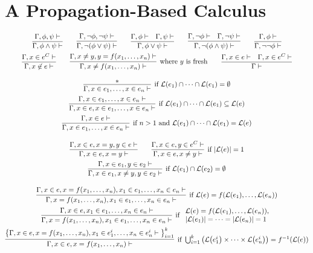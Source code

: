 
\section{A Propagation-Based Calculus}
\label{sect:calculus}

\begin{table}
  \begin{gather*}
    \infer
    {\seqq{\phi \wedge \psi}}
    {\seqq{\phi, \psi}}
    \qquad
    \infer
    {\seqq{ \neg(\phi \vee \psi)}}
    {\seqq{ \neg\phi, \neg\psi}}
    \qquad
    \infer
    {\seqq{\phi \vee \psi}}
    {\seqq{\phi} & \seqq{\psi}}
    \qquad
    \infer
    {\seqq{\neg(\phi \wedge \psi)}}
    {\seqq{\neg\phi} & \seqq{\neg\psi}}
    \qquad
    \infer
    {\seqq{ \neg\neg\phi}}
    {\seqq{\phi}}
    \\
    \infer
    {\seqq{x \not\in e}}
    {\seqq{x \in e^C}}
    \qquad
    \infer[\text{where~} y \text{~is fresh}]
    {\seqq{x \not= f(x_1, \ldots, x_n)}}
    {\seqq{x \not= y, y = f(x_1, \ldots, x_n)}}
    \qquad
    \infer
    {\seqq{}}
    {\seqq{x \in e} & \seqq{x \in e^C}}
    \\[2ex]
    \infer[\text{if~} \lang{e_1} \cap \cdots \cap\lang{e_1} = \emptyset]
    {\seqq{x \in e_1, \ldots, x \in e_n}}
    {*}
    \\
    \infer[\text{if~} \lang{e_1} \cap \cdots \cap\lang{e_1} \subseteq \lang{e}]
    {\seqq{x \in e, x \in e_1, \ldots, x \in e_n}}
    {\seqq{x \in e_1, \ldots, x \in e_n}}
    \\
    \infer[\text{if~} n > 1 \text{~and~} \lang{e_1} \cap \cdots \cap\lang{e_1} = \lang{e}]
    {\seqq{x \in e_1, \ldots, x \in e_n}}
    {\seqq{x \in e}}
    \\[2ex]
    \infer
    {\seqq{x \in e, x = y}}
    {\seqq{x \in e, x = y, y \in e}}
    \qquad
    \infer[\text{if~} |\lang{e}| = 1]
    {\seqq{x \in e, x \not= y}}
    {\seqq{x \in e, y \in e^C}}
    \\
    \infer[\text{if~} \lang{e_1} \cap \lang{e_2} = \emptyset]
    {\seqq{x \in e_1, x \not= y, y \in e_2}}
    {\seqq{x \in e_1, y \in e_2}}
    \\[2ex]
    \infer[\text{if~} \lang{e} = f(\lang{e_1}, \ldots, \lang{e_n})]
    {\seqq{x = f(x_1, \ldots, x_n), x_1 \in e_1, \ldots, x_n \in e_n}}
    {\seqq{x \in e, x = f(x_1, \ldots, x_n), x_1 \in e_1, \ldots, x_n \in e_n}}
    \\
    \infer[\text{if~}
    \begin{array}{l}
      \lang{e} = f(\lang{e_1}, \ldots, \lang{e_n}),
      \\
      |\lang{e_1}| = \cdots = |\lang{e_n}| = 1
    \end{array}]
    {\seqq{x = f(x_1, \ldots, x_n), x_1 \in e_1, \ldots, x_n \in e_n}}
    {\seqq{x \in e, x_1 \in e_1, \ldots, x_n \in e_n}}
    \\
    \infer[\text{if~}
    \bigcup_{i=1}^k \big( \lang{e_1^i} \times \cdots \times \lang{e_n^i} \big) =
    f^{-1}(\lang{e})]
    {\seqq{x \in e, x = f(x_1, \ldots, x_n)}}
    {\big\{\seqq{x \in e, x = f(x_1, \ldots, x_n),
        x_1 \in e_1^i, \ldots, x_n \in e_n^i}\big\}_{i=1}^k}
  \end{gather*}
  

\end{table}
